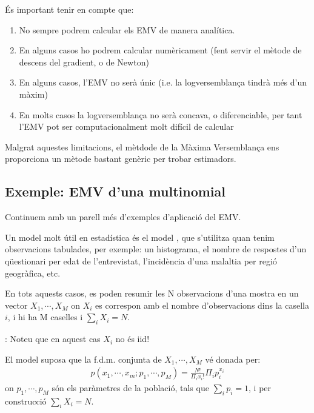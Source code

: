 \documentclass[letterpaper,10pt,english]{sphinxmanual}
\begin{document}
És important tenir en compte que:
\begin{enumerate}
%
\item {} 
No sempre podrem calcular els EMV de manera analítica.

\item {} 
En alguns casos ho podrem calcular numèricament (fent servir el mètode de descens del gradient, o de Newton)

\item {} 
En alguns casos, l’EMV no serà únic (i.e. la log\sphinxhyphen{}versemblança tindrà més d’un màxim)

\item {} 
En molts casos la log\sphinxhyphen{}versemblança no serà concava, o diferenciable, per tant l’EMV pot ser computacionalment molt difícil de calcular

\end{enumerate}

Malgrat aquestes limitacions, el mètdode de la Màxima Versemblança
ens proporciona un mètode bastant genèric per trobar estimadors.


\subsection{Exemple: EMV d’una multinomial}
\label{\detokenize{0_Intro/0_3_Estimacio:exemple-emv-d-una-multinomial}}
Continuem amb un parell més d’exemples d’aplicació del EMV.

Un model molt útil en estadística és el model , que
s’utilitza quan tenim observacions tabulades, per exemple: un histograma,
el nombre de respostes d’un qüestionari per edat de l’entrevistat,
l’incidència d’una malaltia per regió geogràfica, etc.

En tots aquests casos, es poden resumir les N observacions d’una mostra en un
vector \(X_1, \cdots, X_M\) on \(X_i\) es correspon amb el nombre d’observacions dins la casella \(i\),
i hi ha M caselles i \(\sum_i X_i = N\).

: Noteu que en aquest cas \(X_i\) no és iid!

El model  suposa que la f.d.m. conjunta de \(X_1, \cdots, X_M\) vé donada per:
\begin{equation*}
\begin{split}p(x_1, \cdots, x_m; p_1, \cdots, p_M) = \frac{N!}{\Pi_i {x_i!}}\Pi_i p_i^{x_i}\end{split}
\end{equation*}
on \(p_1, \cdots, p_M\) són els paràmetres de la població, tals que \(\sum_i p_i = 1\),
i per construcció \(\sum_i X_i = N\).
\end{document}
